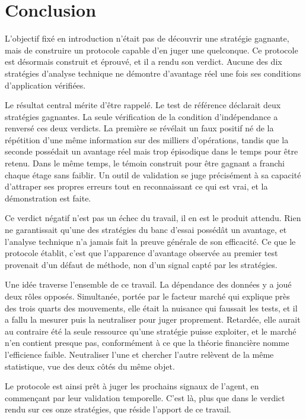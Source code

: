 \chapter{Conclusion}
\label{chap:conclusion}

L'objectif fixé en introduction n'était pas de découvrir une stratégie
gagnante, mais de construire un protocole capable d'en juger une quelconque.
Ce protocole est désormais construit et éprouvé, et il a rendu son verdict.
Aucune des dix stratégies d'analyse technique ne démontre d'avantage réel une
fois ses conditions d'application vérifiées.

Le résultat central mérite d'être rappelé. Le test de référence déclarait deux
stratégies gagnantes. La seule vérification de la condition d'indépendance a
renversé ces deux verdicts. La première se révélait un faux positif né de la
répétition d'une même information sur des milliers d'opérations, tandis que la
seconde possédait un avantage réel mais trop épisodique dans le temps pour être
retenu. Dans le même temps, le témoin construit pour être gagnant a franchi
chaque étage sans faiblir. Un outil de validation se juge précisément à sa
capacité d'attraper ses propres erreurs tout en reconnaissant ce qui est vrai,
et la démonstration est faite.

Ce verdict négatif n'est pas un échec du travail, il en est le produit
attendu. Rien ne garantissait qu'une des stratégies du banc d'essai possédât
un avantage, et l'analyse technique n'a jamais fait la preuve générale de son
efficacité. Ce que le protocole établit, c'est que l'apparence d'avantage
observée au premier test provenait d'un défaut de méthode, non d'un signal
capté par les stratégies.

Une idée traverse l'ensemble de ce travail. La dépendance des données y a joué
deux rôles opposés. Simultanée, portée par le facteur marché qui explique près
des trois quarts des mouvements, elle était la nuisance qui faussait les
tests, et il a fallu la mesurer puis la neutraliser pour juger proprement.
Retardée, elle aurait au contraire été la seule ressource qu'une stratégie
puisse exploiter, et le marché n'en contient presque pas, conformément à ce
que la théorie financière nomme l'efficience faible. Neutraliser l'une et
chercher l'autre relèvent de la même statistique, vue des deux côtés du même
objet.

Le protocole est ainsi prêt à juger les prochains signaux de l'agent, en
commençant par leur validation temporelle. C'est là, plus que dans le verdict
rendu sur ces onze stratégies, que réside l'apport de ce travail.
